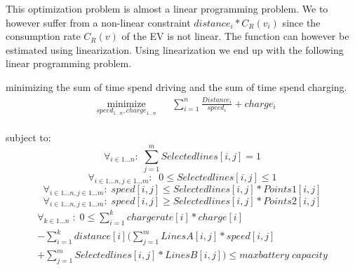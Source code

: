 This optimization problem is almost a linear programming problem. We to however suffer from a non-linear constraint $distance_i*C_R(v_i)$ since the consumption rate $C_R(v)$ of the EV is not linear. The function can however be estimated using linearization. Using linearization we end up with the following linear programming problem.  
 
minimizing the sum of time spend driving and the sum of time spend charging. 
\begin{equation}
\begin{aligned}
 & \underset{speed_{1 \dots n},charge_{1 \dots n}}
{\text{minimize}}
& & \sum_{i=1}^{n} \frac{Distance_i}{speed_i} + charge_i \\
\end{aligned}
\end{equation}\label{eq:objfunction}

subject to: 
\begin{equation}
\forall_{i\in1 \dots n }:\; \sum_{j=1}^{m} Selectedlines[i,j] = 1
\end{equation}
\begin{equation}
\forall_{i\in1 \dots n, j \in 1 \dots m}: \; \;0\leq Selectedlines[i,j] \leq 1
\end{equation}
\begin{equation}
\forall_{i\in1 \dots n, j \in 1 \dots m}:\; speed[i,j] \le Selectedlines[i,j] * Points1[i,j]
\end{equation}
\begin{equation}
\forall_{i\in1 \dots n, j \in 1 \dots m}:\; speed[i,j] \ge Selectedlines[i,j] * Points2[i,j]
\end{equation}
\begin{equation}
\begin{split}
\forall_{k\in1 \dots n}\;:\;0 \le\sum_{i=1}^{k}chargerate[i]*charge[i]\\
-\sum_{i=1}^{k} distance[i](\sum_{j=1}^{m} LinesA[i,j]*speed[i,j]\\
+\sum_{j=1}^{m} Selectedlines[i,j]*LinesB[i,j]) \le maxbattery\;capacity
\end{split}
\end{equation}

